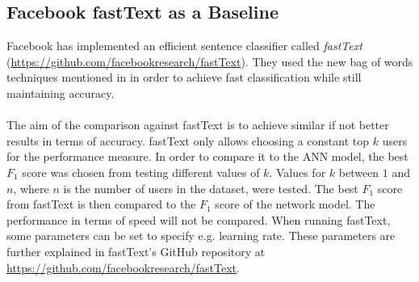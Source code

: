 \subsection{Facebook fastText as a Baseline}
Facebook has implemented an efficient sentence classifier called \textit{fastText} (\url{https://github.com/facebookresearch/fastText}). They used the new bag of words techniques mentioned in \parencite{joulin2016bag} in order to achieve fast classification while still maintaining accuracy.
\\\\
The aim of the comparison against fastText is to achieve similar if not better results in terms of accuracy. fastText only allows choosing a constant top $k$ users for the performance measure. In order to compare it to the ANN model, the best $F_1$ score was chosen from testing different values of $k$. Values for $k$ between $1$ and $n$, where $n$ is the number of users in the dataset, were tested. The best $F_1$ score from fastText is then compared to the $F_1$ score of the network model.
The performance in terms of speed will not be compared. When running fastText, some parameters can be set to specify e.g. learning rate. These parameters are further explained in fastText's GitHub repository at \url{https://github.com/facebookresearch/fastText}.